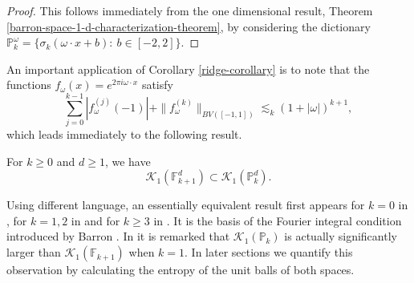 \begin{proof}
 This follows immediately from the one dimensional result, Theorem \ref{barron-space-1-d-characterization-theorem}, by considering the dictionary $\mathbb{P}_k^\omega = \{\sigma_k(\omega\cdot x + b):~b\in [-2,2]\}$.
\end{proof}

An important application of Corollary \ref{ridge-corollary} is to note that the functions $f_\omega(x) = e^{2\pi i \omega\cdot x}$ satisfy
\begin{equation}\label{eq-550}
 \sum_{j=0}^{k-1} |f_\omega^{(j)}(-1)| + \|f_\omega^{(k)}\|_{BV([-1,1])} \lesssim_k (1 + |\omega|)^{k+1},
\end{equation}
which leads immediately to the following result.
\begin{theorem}
 For $k \geq 0$ and $d \geq 1$, we have
 \begin{equation}
  \mathcal{K}_1(\mathbb{F}^d_{k+1}) \subset \mathcal{K}_1(\mathbb{P}^d_k).
 \end{equation}

\end{theorem}

Using different language, an essentially equivalent result first appears for $k=0$ in \cite{barron1993universal}, for $k=1,2$ in \cite{klusowski2018approximation} and for $k \geq 3$ in \cite{CiCP-28-1707}. It is the basis of the Fourier integral condition introduced by Barron \cite{barron1993universal}. In \cite{wojtowytsch2020representation} it is remarked that $\mathcal{K}_1(\mathbb{P}_k)$ is actually significantly larger than $\mathcal{K}_1(\mathbb{F}_{k+1})$ when $k=1$. In later sections we quantify this observation by calculating the entropy of the unit balls of both spaces.

